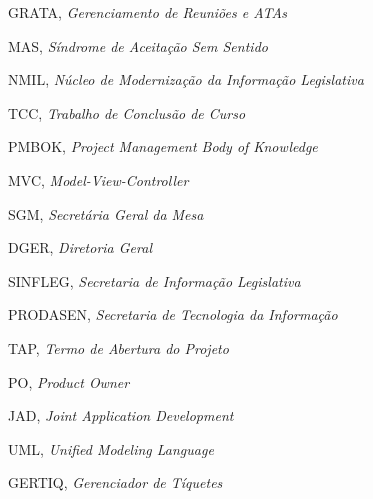 \begin{siglas}
	\item GRATA, \textit{Gerenciamento de Reuniões e ATAs}
  	\item MAS, \textit{Síndrome de Aceitação Sem Sentido}
  	\item NMIL, \textit{Núcleo de Modernização da Informação Legislativa}
  	\item TCC, \textit{Trabalho de Conclusão de Curso}
  	\item PMBOK, \textit{Project Management Body of Knowledge}
  	\item MVC, \textit{Model-View-Controller}
  	\item SGM, \textit{Secretária Geral da Mesa}
  	\item DGER, \textit{Diretoria Geral}
  	\item SINFLEG, \textit{Secretaria de Informação Legislativa}
  	\item PRODASEN, \textit{Secretaria de Tecnologia da Informação}
  	\item TAP, \textit{Termo de Abertura do Projeto}
  	\item PO, \textit{Product Owner}
  	\item JAD, \textit{Joint Application Development}
  	\item UML, \textit{Unified Modeling Language}
  	\item GERTIQ, \textit{Gerenciador de Tíquetes}
\end{siglas}